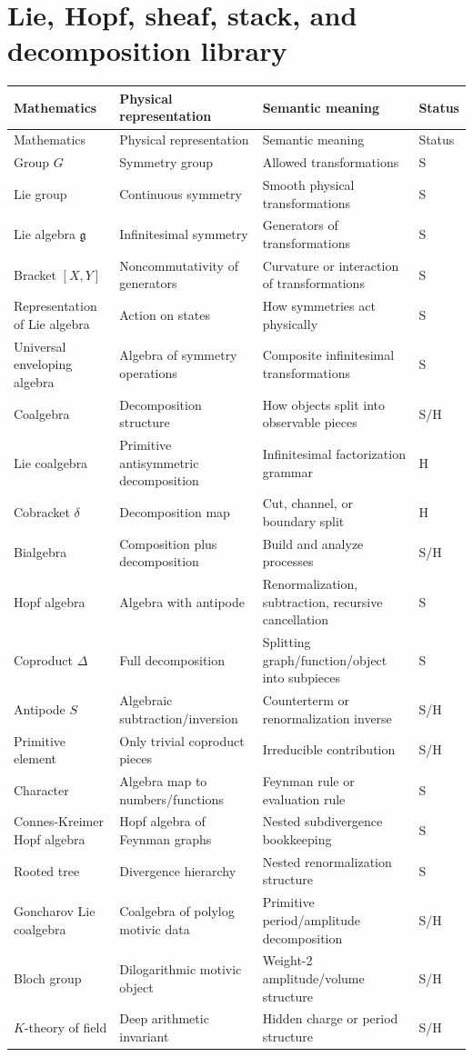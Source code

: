\documentclass[11pt]{article}
\newcommand{\status}[1]{\textsf{#1}}
\newcommand{\entry}[4]{#1 & #2 & #3 & \status{#4}\\}
\begin{document}
\section{Lie, Hopf, sheaf, stack, and decomposition library}
\begin{longtable}{@{}>{\raggedright\arraybackslash}p{}>{\raggedright\arraybackslash}p{}>{\raggedright\arraybackslash}p{}>{\centering\arraybackslash}p{}@{}}
\toprule
Mathematics & Physical representation & Semantic meaning & Status\\
\midrule
\endfirsthead
\toprule
Mathematics & Physical representation & Semantic meaning & Status\\
\midrule
\endhead
\bottomrule
\endfoot
\entry{Group $G$}{Symmetry group}{Allowed transformations}{S}
\entry{Lie group}{Continuous symmetry}{Smooth physical transformations}{S}
\entry{Lie algebra $\mathfrak g$}{Infinitesimal symmetry}{Generators of transformations}{S}
\entry{Bracket $[X,Y]$}{Noncommutativity of generators}{Curvature or interaction of transformations}{S}
\entry{Representation of Lie algebra}{Action on states}{How symmetries act physically}{S}
\entry{Universal enveloping algebra}{Algebra of symmetry operations}{Composite infinitesimal transformations}{S}
\entry{Coalgebra}{Decomposition structure}{How objects split into observable pieces}{S/H}
\entry{Lie coalgebra}{Primitive antisymmetric decomposition}{Infinitesimal factorization grammar}{H}
\entry{Cobracket $\delta$}{Decomposition map}{Cut, channel, or boundary split}{H}
\entry{Bialgebra}{Composition plus decomposition}{Build and analyze processes}{S/H}
\entry{Hopf algebra}{Algebra with antipode}{Renormalization, subtraction, recursive cancellation}{S}
\entry{Coproduct $\Delta$}{Full decomposition}{Splitting graph/function/object into subpieces}{S}
\entry{Antipode $S$}{Algebraic subtraction/inversion}{Counterterm or renormalization inverse}{S/H}
\entry{Primitive element}{Only trivial coproduct pieces}{Irreducible contribution}{S/H}
\entry{Character}{Algebra map to numbers/functions}{Feynman rule or evaluation rule}{S}
\entry{Connes-Kreimer Hopf algebra}{Hopf algebra of Feynman graphs}{Nested subdivergence bookkeeping}{S}
\entry{Rooted tree}{Divergence hierarchy}{Nested renormalization structure}{S}
\entry{Goncharov Lie coalgebra}{Coalgebra of polylog motivic data}{Primitive period/amplitude decomposition}{S/H}
\entry{Bloch group}{Dilogarithmic motivic object}{Weight-2 amplitude/volume structure}{S/H}
\entry{$K$-theory of field}{Deep arithmetic invariant}{Hidden charge or period structure}{S/H}

\end{longtable}
\end{document}
